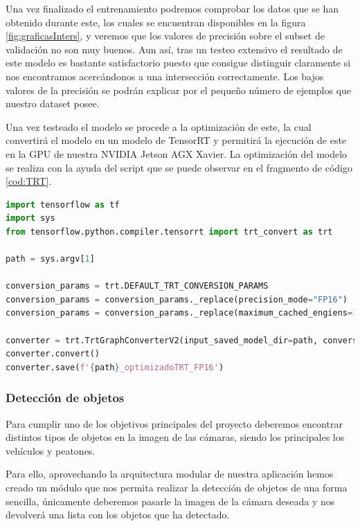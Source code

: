 Una vez finalizado el entrenamiento podremos comprobar los datos que se han obtenido durante este, los cuales se encuentran disponibles en la figura \ref{fig:graficasInters}, y veremos que los valores de precisión sobre el subset de validación no son muy buenos. Aun así, tras un testeo extensivo el resultado de este modelo es bastante satisfactorio puesto que consigue distinguir claramente si nos encontramos acercándonos a una intersección correctamente. Los bajos valores de la precisión se podrán explicar por el pequeño número de ejemplos que nuestro dataset posee.


Una vez testeado el modelo se procede a la optimización de este, la cual convertirá el modelo en un modelo de TensorRT y permitirá la ejecución de este en la GPU de nuestra NVIDIA Jetson AGX Xavier. La optimización del modelo se realiza con la ayuda del script que se puede observar en el fragmento de código \ref{cod:TRT}.



\begin{lstlisting}[float, language=python,caption=Script utilizado para convertir un SavedModel de tensorflow a un modelo optimizado de TensorRT,label={cod:TRT}]
import tensorflow as tf
import sys
from tensorflow.python.compiler.tensorrt import trt_convert as trt

path = sys.argv[1]

conversion_params = trt.DEFAULT_TRT_CONVERSION_PARAMS
conversion_params = conversion_params._replace(precision_mode="FP16")
conversion_params = conversion_params._replace(maximum_cached_engiens=100)

converter = trt.TrtGraphConverterV2(input_saved_model_dir=path, conversion_params=conversion_params)
converter.convert()
converter.save(f'{path}_optimizadoTRT_FP16')    
\end{lstlisting}

\clearpage
\newpage

\subsubsection{Detección de objetos}

Para cumplir uno de los objetivos principales del proyecto deberemos encontrar distintos tipos de objetos en la imagen de las cámaras, siendo los principales los vehículos y peatones.

Para ello, aprovechando la arquitectura modular de nuestra aplicación hemos creado un módulo que nos permita realizar la detección de objetos de una forma sencilla, únicamente deberemos pasarle la imagen de la cámara deseada y nos devolverá una lista con los objetos que ha detectado.

